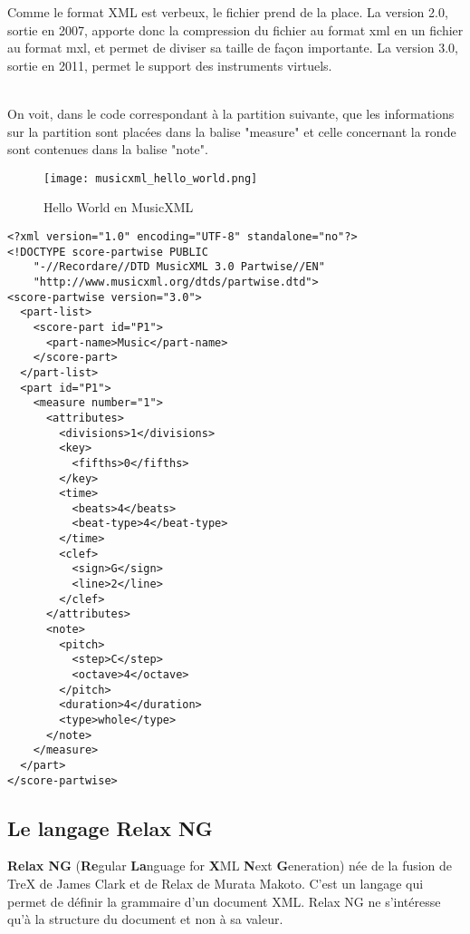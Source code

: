 \par
Comme le format XML est verbeux, le fichier prend de la place. La version 2.0, sortie en 2007, apporte donc la compression du fichier au format xml en un fichier au format mxl, et permet de diviser sa taille de façon importante. La version 3.0, sortie en 2011, permet le support des instruments virtuels.\\~\\

\par
On voit, dans le code correspondant à la partition suivante, que les informations sur la partition sont placées dans la balise "measure" et celle concernant la ronde sont contenues dans la balise "note".

\begin{figure}[!h] %
\centering
\texttt{[image: musicxml\_hello\_world.png]}\\[1cm]
\caption{Hello World en MusicXML}
\label{Hello World en MusicXML}
\end{figure}


\begin{lstlisting}[caption=Document XML d'un Hello World en MusicXML, label=ruleml]
<?xml version="1.0" encoding="UTF-8" standalone="no"?>
<!DOCTYPE score-partwise PUBLIC
    "-//Recordare//DTD MusicXML 3.0 Partwise//EN"
    "http://www.musicxml.org/dtds/partwise.dtd">
<score-partwise version="3.0">
  <part-list>
    <score-part id="P1">
      <part-name>Music</part-name>
    </score-part>
  </part-list>
  <part id="P1">
    <measure number="1">
      <attributes>
        <divisions>1</divisions>
        <key>
          <fifths>0</fifths>
        </key>
        <time>
          <beats>4</beats>
          <beat-type>4</beat-type>
        </time>
        <clef>
          <sign>G</sign>
          <line>2</line>
        </clef>
      </attributes>
      <note>
        <pitch>
          <step>C</step>
          <octave>4</octave>
        </pitch>
        <duration>4</duration>
        <type>whole</type>
      </note>
    </measure>
  </part>
</score-partwise>
\end{lstlisting}


\subsection{Le langage Relax NG}

\textbf{Relax NG} (\textbf{Re}gular \textbf{La}nguage for \textbf{X}ML \textbf{N}ext \textbf{G}eneration) \cite{relaxng} née de la fusion de TreX de James Clark et de Relax de Murata Makoto. C'est un langage qui permet de définir la grammaire d'un document XML. Relax NG ne s'intéresse qu'à la structure du document et non à sa valeur.

